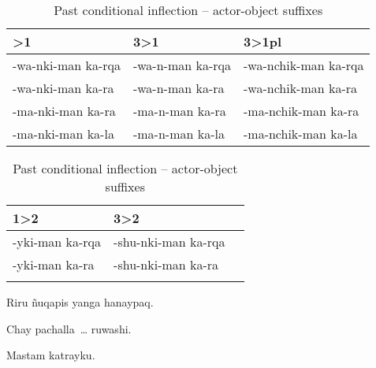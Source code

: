 \begin{table}
\caption{Past conditional inflection -- actor-object suffixes}
\label{Tab23b} 
\small
\begin{tabularx}{\textwidth}{p{4cm}lX}
\lsptoprule
2>1		& 3>1		& 3>1pl	\\
\midrule
-wa-nki-man ka-rqa\tss{\AMV}	& -wa-n-man ka-rqa\tss{\AMV}	&	-wa-nchik-man ka-rqa\tss{\AMV}	   \\
-wa-nki-man ka-ra\tss{\LT}	& -wa-n-man ka-ra\tss{\LT}	&	-wa-nchik-man ka-ra\tss{\LT}	 \\
-ma-nki-man ka-ra\tss{\ACH,\SP}	&	-ma-n-man ka-ra\tss{\ACH,\SP}	&	-ma-nchik-man ka-ra\tss{\ACH,\SP}\\
-ma-nki-man ka-la\tss{\CH}	&	-ma-n-man ka-la\tss{\CH}	&	-ma-nchik-man ka-la\tss{\CH}	\\
\end{tabularx} 
\bigskip
\begin{tabularx}{\textwidth}{p{4cm}lX}
 1>2	& 3>2	\\
\midrule
 -yki-man ka-rqa \tss{\AMV}	& -shu-nki-man ka-rqa\tss{\AMV} \\
 -yki-man ka-ra \tss{\LT}	&	-shu-nki-man ka-ra\tss{\LT} \\
\lspbottomrule
\end{tabularx} 
\end{table}


%
{Riru  ñuqapis yanga hanaypaq.}%
{}%
{}{}%

%
{Chay pachalla~\dots{} ruwashi.}%
{}%
{}{}%

%
{Mastam katrayku.}%
{}%
{}{}%

